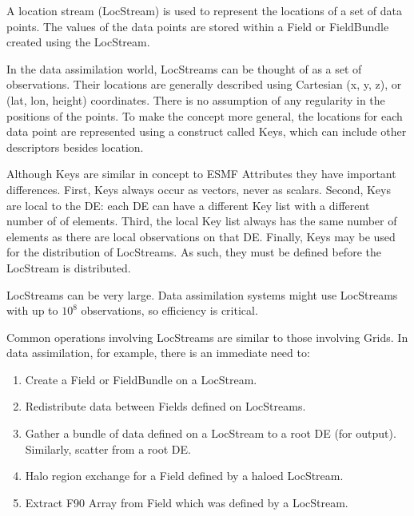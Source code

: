 %

A location stream (LocStream) is used to represent the locations of
a set of data points.  The values of the data points are stored within
a Field or FieldBundle created using the LocStream.

In the data assimilation world, LocStreams can
be thought of as a set of observations.  Their locations are generally
described using Cartesian (x, y, z), or (lat, lon, height) coordinates.
There is no assumption of any regularity in the positions of the points.
To make the concept more general, the locations for each data point are
represented using a construct called Keys, which can include other
descriptors besides location.

Although Keys are similar in concept to ESMF Attributes they have important
differences. First, Keys always occur as vectors, never as scalars.
Second, Keys are local to the DE: each DE can have a different Key
list with a different number of of elements. Third, the local Key 
list always has the same number of elements as there are local observations
on that DE.  Finally, Keys may be used for the distribution of LocStreams.
As such, they must be defined before the LocStream is distributed.

LocStreams can be very large. Data assimilation systems might use
LocStreams with up to $10^{8}$ observations, so efficiency is critical.

Common operations involving LocStreams are similar to those involving Grids.
In data assimilation, for example, there is an immediate need to:

\begin{enumerate}
\item Create a Field or FieldBundle on a LocStream.
\item Redistribute data between Fields defined on LocStreams.
\item Gather a bundle of data defined on a LocStream to a root
DE (for output). Similarly, scatter from a root DE.
\item Halo region exchange for a Field defined by a haloed LocStream.
\item Extract F90 Array from Field which was defined by a LocStream.
\end{enumerate}


